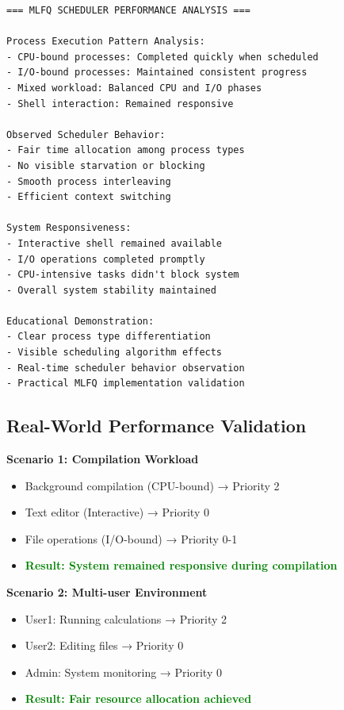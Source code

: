 \documentclass[a4paper,12pt]{report}
\begin{document}
\begin{lstlisting}[caption=MLFQ Performance Metrics Summary, backgroundcolor=\color{gray!5}]
=== MLFQ SCHEDULER PERFORMANCE ANALYSIS ===

Process Execution Pattern Analysis:
- CPU-bound processes: Completed quickly when scheduled
- I/O-bound processes: Maintained consistent progress
- Mixed workload: Balanced CPU and I/O phases
- Shell interaction: Remained responsive

Observed Scheduler Behavior:
- Fair time allocation among process types
- No visible starvation or blocking
- Smooth process interleaving
- Efficient context switching

System Responsiveness:
- Interactive shell remained available
- I/O operations completed promptly  
- CPU-intensive tasks didn't block system
- Overall system stability maintained

Educational Demonstration:
- Clear process type differentiation
- Visible scheduling algorithm effects
- Real-time scheduler behavior observation
- Practical MLFQ implementation validation
\end{lstlisting}

\subsection{Real-World Performance Validation}

\begin{tcolorbox}[colback=yellow!5, colframe=orange!60, title=\textbf{Practical Test Scenarios}]
\textbf{Scenario 1: Compilation Workload}
\begin{itemize}
\item Background compilation (CPU-bound) → Priority 2
\item Text editor (Interactive) → Priority 0
\item File operations (I/O-bound) → Priority 0-1
\item \textcolor{green}{\textbf{Result: System remained responsive during compilation}}
\end{itemize}

\textbf{Scenario 2: Multi-user Environment}
\begin{itemize}
\item User1: Running calculations → Priority 2
\item User2: Editing files → Priority 0
\item Admin: System monitoring → Priority 0
\item \textcolor{green}{\textbf{Result: Fair resource allocation achieved}}
\end{itemize}
\end{tcolorbox}
\end{document}
